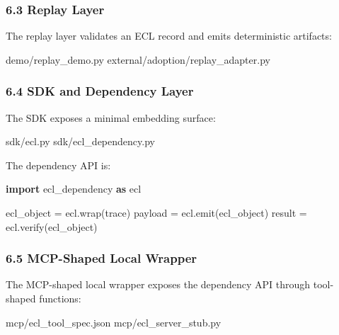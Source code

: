 \documentclass[
]{article}
\newenvironment{Shaded}{}{}
\newcommand{\ImportTok}[1]{\textcolor[rgb]{0.00,0.50,0.00}{\textbf{#1}}}
\newcommand{\NormalTok}[1]{#1}
\newcommand{\OperatorTok}[1]{\textcolor[rgb]{0.40,0.40,0.40}{#1}}
\begin{document}
\subsubsection{6.3 Replay Layer}\label{replay-layer}

The replay layer validates an ECL record and emits deterministic
artifacts:

\begin{Shaded}
\begin{Highlighting}[]
\NormalTok{demo/replay\_demo.py}
\NormalTok{external/adoption/replay\_adapter.py}
\end{Highlighting}
\end{Shaded}

\subsubsection{6.4 SDK and Dependency
Layer}\label{sdk-and-dependency-layer}

The SDK exposes a minimal embedding surface:

\begin{Shaded}
\begin{Highlighting}[]
\NormalTok{sdk/ecl.py}
\NormalTok{sdk/ecl\_dependency.py}
\end{Highlighting}
\end{Shaded}

The dependency API is:

\begin{Shaded}
\begin{Highlighting}[]
\ImportTok{import}\NormalTok{ ecl\_dependency }\ImportTok{as}\NormalTok{ ecl}

\NormalTok{ecl\_object }\OperatorTok{=}\NormalTok{ ecl.wrap(trace)}
\NormalTok{payload }\OperatorTok{=}\NormalTok{ ecl.emit(ecl\_object)}
\NormalTok{result }\OperatorTok{=}\NormalTok{ ecl.verify(ecl\_object)}
\end{Highlighting}
\end{Shaded}

\subsubsection{6.5 MCP-Shaped Local
Wrapper}\label{mcp-shaped-local-wrapper}

The MCP-shaped local wrapper exposes the dependency API through
tool-shaped functions:

\begin{Shaded}
\begin{Highlighting}[]
\NormalTok{mcp/ecl\_tool\_spec.json}
\NormalTok{mcp/ecl\_server\_stub.py}
\end{Highlighting}
\end{Shaded}
\end{document}
